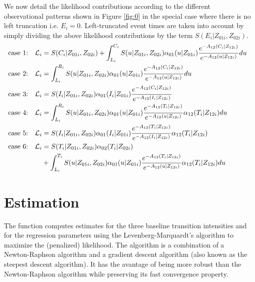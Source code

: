 \documentclass[article]{jss}
\begin{document}
We now detail the likelihood contributions according to the different
observational patterns shown in Figure \ref{fig:0} in the special
case where there is no left truncation i.e. \(E_i=0\).
Left-truncated event times are taken into account by simply dividing 
the above
likelihood contributions by the term \({S(E_{i}|Z_{01i},Z_{02i})}\).
\begin{equation}\label{eq:1}
 \begin{split}
 \text{case 1:}\quad {\cal L}_i & = S(C_i|Z_{01i},Z_{02i}) + \int_{L_i}^{C_i} S(u|Z_{01i},Z_{02i}) \alpha_{01}(u|Z_{01i}) \frac{e^{-{A}_{12}(C_i|Z_{12i})}}{e^{-{A}_{12}(u|Z_{12i})}}du \\
 \text{case 2:}\quad {\cal L}_i & = \int_{L_i} ^{R_i} S(u|Z_{01i},Z_{02i}) \alpha_{01}(u|Z_{01i}) \frac{e^{-{A}_{12}(C_i|Z_{12i})}}{e^{-{A}_{12}(u|Z_{12i})}}du\\
 \text{case 3:}\quad {\cal L}_i & =  S(I_i|Z_{01i},Z_{02i}) \alpha_{01}(I_i|Z_{01i}) \frac{e^{-{A}_{12}(C_i|Z_{12i})}}{e^{-{A}_{12}(I_i|Z_{12i})}}\\
 \text{case 4:}\quad {\cal L}_i & = \int_{L_i} ^{R_i} S(u|Z_{01i},Z_{02i}) \alpha_{01}(u|Z_{01i}) \frac{e^{-{A}_{12}(T_i|Z_{12i})}}{e^{-{A}_{12}(u|Z_{12i})}} \alpha_{12}(T_i|Z_{12i})du\\
 \text{case 5:}\quad  {\cal L}_i & =  S(I_i|Z_{01i},Z_{02i}) \alpha_{01}(I_i|Z_{01i}) \frac{e^{-{A}_{12}(T_i|Z_{12i})}}{e^{-{A}_{12}(I_i|Z_{12i})}} \alpha_{12}(T_i|Z_{12i})\\ 
 \text{case 6:}\quad {\cal L}_i & = S(T_i|Z_{01i},Z_{02i})\alpha_{02}(T_i|Z_{02i}) \\
  \qquad & + \int_{L_i}^{T_i} S(u|Z_{01i},Z_{02i}) \alpha_{01}(u|Z_{01i}) \frac{e^{-{A}_{12}(T_i|Z_{12i})}}{e^{-{A}_{12}(u|Z_{12i})}} \alpha_{12}(T_i|Z_{12i}) du \\
 \end{split}
 \end{equation}
\section{Estimation}
\label{sec-3}

The  function computes estimates for the three baseline
transition intensities and for the regression parameters using the
Levenberg-Marquardt's algorithm \citep{Levenberg_1944,Marquardt_1963}
to maximize the (penalized) likelihood.  The algorithm is a
combination of a Newton-Raphson algorithm and a gradient descent
algorithm (also known as the steepest descent algorithm). It has the
avantage of being more robust than the Newton-Raphson algorithm while
preserving its fast convergence property.
\end{document}
